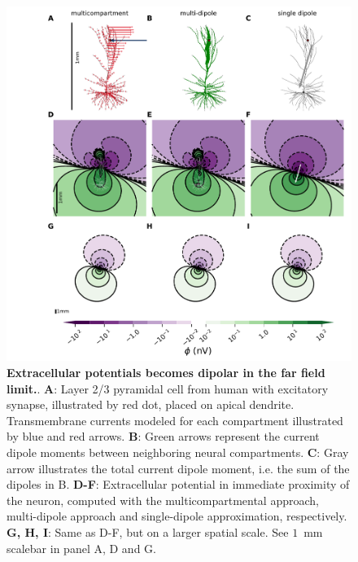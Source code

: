 \documentclass[preprint,10pt,authoryear]{elsarticle}
\begin{document}
\begin{figure}[H]
	\centering
	\includegraphics[width=1.0\textwidth]{fig_dipole_field}
	\caption{\textbf{Extracellular potentials becomes dipolar in the far field limit.}. 
	\textbf{A}: Layer 2/3 pyramidal cell from human \citep{EYAL2016} with excitatory synapse, illustrated by red dot, placed on apical dendrite. Transmembrane currents modeled for each compartment illustrated by blue and red arrows.
	\textbf{B}: Green arrows represent the current dipole moments between neighboring neural compartments.
	\textbf{C}: Gray arrow illustrates the total current dipole moment, i.e. the sum of the dipoles in B.
	\textbf{D-F}: Extracellular potential in immediate proximity of the neuron, computed with the multicompartmental approach, multi-dipole approach and single-dipole approximation, respectively.
	\textbf{G, H, I}: Same as D-F, but on a larger spatial scale. See $1$~mm scalebar in panel A, D and G.
	}
	\label{fig:dipole_field}
\end{figure}
\end{document}
